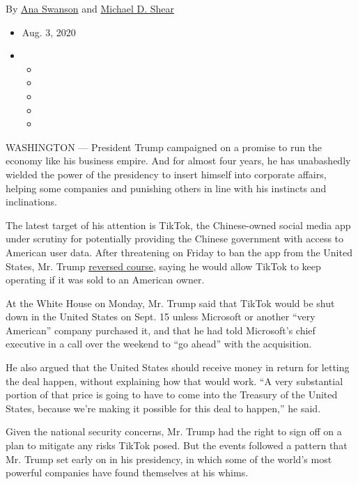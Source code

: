 By \href{https://www.nytimes.com/by/ana-swanson}{Ana Swanson} and
\href{https://www.nytimes.com/by/michael-d-shear}{Michael D. Shear}

\begin{itemize}
\item
  Aug. 3, 2020
\item
  \begin{itemize}
  \item
  \item
  \item
  \item
  \item
  \end{itemize}
\end{itemize}

WASHINGTON --- President Trump campaigned on a promise to run the
economy like his business empire. And for almost four years, he has
unabashedly wielded the power of the presidency to insert himself into
corporate affairs, helping some companies and punishing others in line
with his instincts and inclinations.

The latest target of his attention is TikTok, the Chinese-owned social
media app under scrutiny for potentially providing the Chinese
government with access to American user data. After threatening on
Friday to ban the app from the United States, Mr. Trump
\href{https://www.nytimes.com/2020/08/03/technology/trump-tiktok-microsoft.html}{reversed
course}, saying he would allow TikTok to keep operating if it was sold
to an American owner.

At the White House on Monday, Mr. Trump said that TikTok would be shut
down in the United States on Sept. 15 unless Microsoft or another ``very
American'' company purchased it, and that he had told Microsoft's chief
executive in a call over the weekend to ``go ahead'' with the
acquisition.

He also argued that the United States should receive money in return for
letting the deal happen, without explaining how that would work. ``A
very substantial portion of that price is going to have to come into the
Treasury of the United States, because we're making it possible for this
deal to happen,'' he said.

Given the national security concerns, Mr. Trump had the right to sign
off on a plan to mitigate any risks TikTok posed. But the events
followed a pattern that Mr. Trump set early on in his presidency, in
which some of the world's most powerful companies have found themselves
at his whims.


